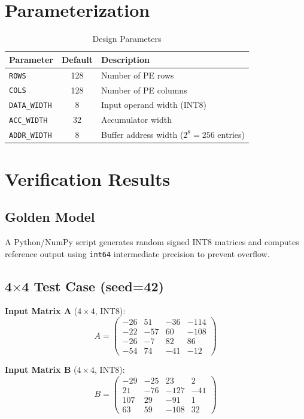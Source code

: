 \documentclass[12pt, a4paper]{article}
\begin{document}
\section{Parameterization}

\begin{table}[H]
\centering
\caption{Design Parameters}
\begin{tabular}{@{}lcl@{}}
\toprule
\textbf{Parameter} & \textbf{Default} & \textbf{Description} \\
\midrule
\texttt{ROWS}       & 128  & Number of PE rows \\
\texttt{COLS}       & 128  & Number of PE columns \\
\texttt{DATA\_WIDTH} & 8   & Input operand width (INT8) \\
\texttt{ACC\_WIDTH}  & 32  & Accumulator width \\
\texttt{ADDR\_WIDTH} & 8   & Buffer address width ($2^8 = 256$ entries) \\
\bottomrule
\end{tabular}
\end{table}

\section{Verification Results}

\subsection{Golden Model}

A Python/NumPy script generates random signed INT8 matrices and computes reference output using \texttt{int64} intermediate precision to prevent overflow.

\subsection{4$\times$4 Test Case (seed=42)}

\textbf{Input Matrix A} ($4 \times 4$, INT8):
\[
A = \begin{pmatrix}
-26 & 51 & -36 & -114 \\
-22 & -57 & 60 & -108 \\
-26 & -7 & 82 & 86 \\
-54 & 74 & -41 & -12
\end{pmatrix}
\]

\textbf{Input Matrix B} ($4 \times 4$, INT8):
\[
B = \begin{pmatrix}
-29 & -25 & 23 & 2 \\
21 & -76 & -127 & -41 \\
107 & 29 & -91 & 1 \\
63 & 59 & -108 & 32
\end{pmatrix}
\]
\end{document}
